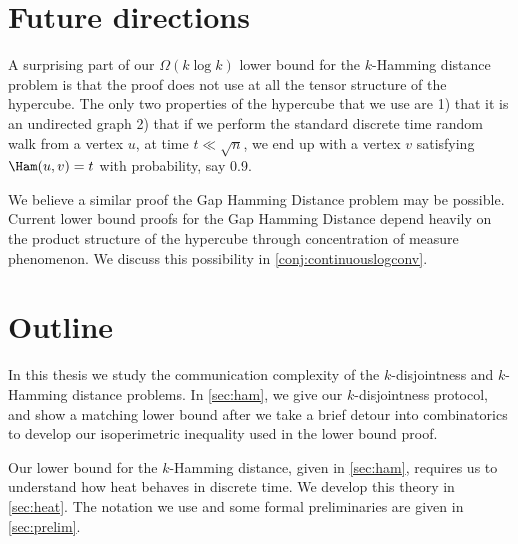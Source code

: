 \section{Future directions}
\label{sec:intro:future}

A surprising part of our  $\Omega(k\log k)$ lower bound for the $k$-Hamming distance problem is that the proof does not use at all the tensor structure of the hypercube. The only two properties of the hypercube that we use are 1) that it is an undirected graph
2) that if we perform the standard discrete time random walk from a vertex $u$, at time $t\ll\sqrt{n}$, we end up with a vertex $v$ satisfying $\Ham(u,v) = t$ with probability, say 0.9. 

We believe a similar proof the Gap Hamming Distance problem may be possible. Current lower bound proofs for the Gap Hamming Distance depend heavily on the product structure of the hypercube through concentration of measure phenomenon. We discuss this possibility in \autoref{conj:continuouslogconv}.

\section{Outline}
In this thesis we study the communication complexity of the 
$k$-disjointness and $k$-Hamming distance problems. 
In \autoref{sec:ham}, we give our $k$-disjointness protocol,
and show a matching lower bound after we take a brief detour 
into combinatorics to develop our isoperimetric inequality used in the lower bound proof.

Our lower bound for the $k$-Hamming distance, given in \autoref{sec:ham},
requires us to understand how heat behaves in discrete time. We develop this
theory in \autoref{sec:heat}. The notation we use and some formal preliminaries
are given in \autoref{sec:prelim}.